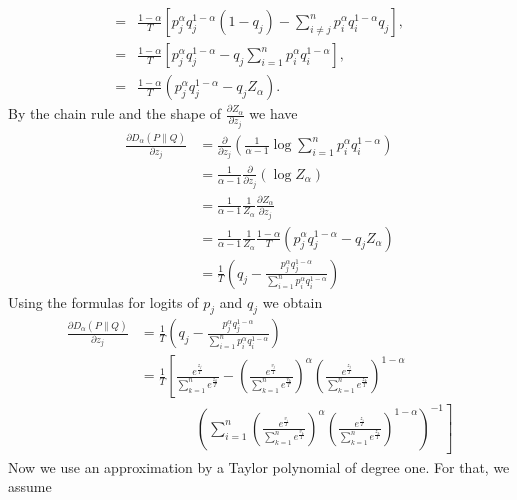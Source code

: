 \begin{rem}
\begin{align*}
	=& \frac{1-\alpha}{T} \left[ p_j^\alpha q_j^{1-\alpha} (1-q_j) - \sum_{i\neq j}^{n} p_i^\alpha q_i^{1-\alpha} q_j \right], \\
	=& \frac{1-\alpha}{T} \left[ p_j^\alpha q_j^{1-\alpha} - q_j \sum_{i=1}^{n} p_i^\alpha q_i^{1-\alpha} \right], \\
	=& \frac{1-\alpha}{T} \left( p_j^\alpha q_j^{1-\alpha} - q_j Z_\alpha\right).
 \end{align*}
 By the chain rule and the shape of $\frac{\partial Z_\alpha}{\partial z_j}$ we have
\begin{equation}
\begin{aligned}
    \frac{\partial D_\alpha(P \| Q)}{\partial z_j}&= \frac{\partial}{\partial z_j} \left(\frac{1}{\alpha-1} \log \sum_{i=1}^{n} p_i^\alpha q_i ^{1-\alpha}\right)\\
    &=\frac{1}{\alpha-1}\frac{\partial}{\partial z_j}\left(\log Z_\alpha\right)\\
    &=\frac{1}{\alpha-1} \frac{1}{Z_\alpha} \frac{\partial Z_\alpha}{\partial z_j}\\
    &=\frac{1}{\alpha-1} \frac{1}{Z_\alpha}\frac{1-\alpha}{T}\left( p_j^\alpha q_j^{1-\alpha} - q_j Z_\alpha\right)\\
    &=\frac{1}{T} \left( q_j - \frac{p_j^\alpha q_j^{1-\alpha}}{\sum_{i=1}^{n} p_i^\alpha q_i^{1-\alpha}} \right)
\end{aligned}
\label{Rényi gradient}
\end{equation}
Using the formulas for logits of $p_j$ and $q_j$ we obtain
\begin{equation}
\begin{aligned}
    \frac{\partial D_\alpha(P \| Q)}{\partial z_j} &= \frac{1}{T} \left( q_j - \frac{p_j^\alpha q_j^{1-\alpha}}{\sum_{i=1}^{n} p_i^\alpha q_i^{1-\alpha}} \right)\\
    &=\frac{1}{T} \left[ \frac{e^{\frac{z_j}{T}}}{\sum_{k=1}^{n} e^{\frac{z_k}{T}}} -  \left( \frac{e^{\frac{v_j}{T}}}{\sum_{k=1}^{n} e^{\frac{v_k}{T}}} \right)^\alpha \left( \frac{e^{\frac{z_j}{T}}}{\sum_{k=1}^{n} e^{\frac{z_k}{T}}} \right)^{1-\alpha} \right. \\
    & \qquad \qquad \left. \left( \sum_{i=1}^{n} \left( \frac{e^{\frac{v_i}{T}}}{\sum_{k=1}^{n} e^{\frac{v_k}{T}}} \right)^\alpha \left( \frac{e^{\frac{z_i}{T}}}{\sum_{k=1}^{n} e^{\frac{z_k}{T}}} \right)^{1-\alpha} \right)^{-1} \right]
\end{aligned}
\label{complicated formula}
\end{equation}
Now we use an approximation by a Taylor polynomial of degree one. For that, we assume

\end{rem}
